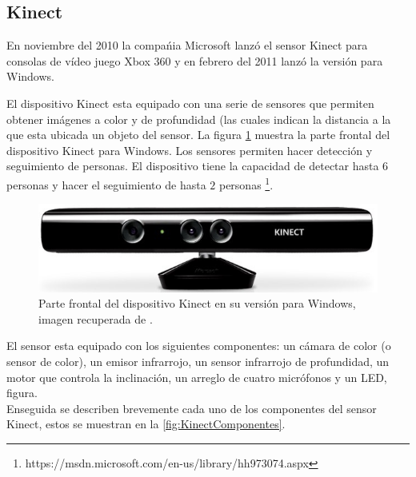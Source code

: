 \subsection{Kinect}

En noviembre del 2010 la compa\'nia Microsoft lanz\'o el sensor Kinect para consolas de vídeo juego Xbox 360 y en febrero del 2011 lanz\'o la versi\'on para Windows.   

El dispositivo Kinect esta equipado con una serie de sensores que permiten obtener imágenes a color y de profundidad (las cuales indican la distancia a la que esta ubicada un objeto del sensor. La figura \ref{fig:KinectPic} muestra  la parte frontal del dispositivo Kinect para Windows. Los sensores permiten hacer detección y seguimiento de personas. El dispositivo tiene la capacidad de detectar hasta $6$ personas y hacer el seguimiento de hasta $2$ personas \footnote{https://msdn.microsoft.com/en-us/library/hh973074.aspx}.    
  
\begin{figure}[h!]
\begin{center}
\includegraphics[scale=.65]{./Figures/Kinect.jpg}
\end{center}
\caption{Parte frontal del dispositivo Kinect en su versión para Windows, imagen recuperada de \footnotemark{}.} 
\label{fig:KinectPic}
\end{figure} 


El sensor esta equipado con los siguientes componentes: un cámara de color (o sensor de color), un emisor infrarrojo, un sensor infrarrojo de profundidad, un motor que controla la inclinación, un arreglo de cuatro micrófonos y un LED, figura\citep{Jana2013}.\\
Enseguida se describen brevemente cada uno de los componentes del sensor Kinect, estos se muestran en la \ref{fig:KinectComponentes}. 

